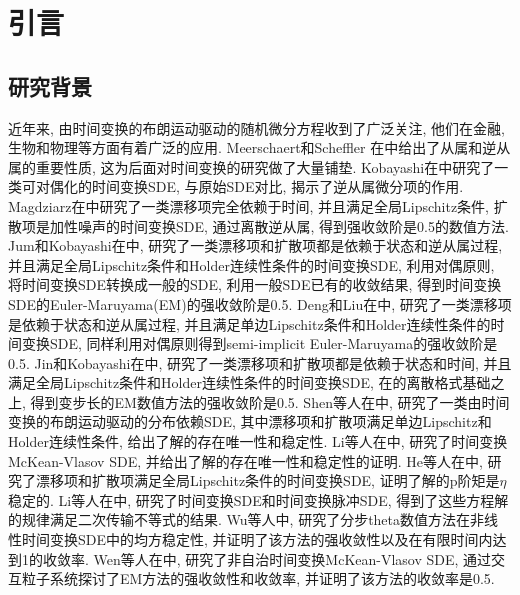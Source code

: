 

\chapter{引言}\label{chap:Intro}

\section{研究背景}\label{sec:background}

近年来, 由时间变换的布朗运动驱动的随机微分方程收到了广泛关注, 他们在金融, 生物和物理等方面有着广泛的应用. Meerschaert和Scheffler 在\cite{meerschaert2004limit}中给出了从属和逆从属的重要性质, 这为后面对时间变换的研究做了大量铺垫. Kobayashi在\cite{kobayashi2011stochastic}中研究了一类可对偶化的时间变换SDE, 与原始SDE对比, 揭示了逆从属微分项的作用. Magdziarz在\cite{magdziarz2009stochastic}中研究了一类漂移项完全依赖于时间, 并且满足全局Lipschitz条件, 扩散项是加性噪声的时间变换SDE, 通过离散逆从属, 得到强收敛阶是0.5的数值方法. Jum和Kobayashi在\cite{jum2014strong}中, 研究了一类漂移项和扩散项都是依赖于状态和逆从属过程, 并且满足全局Lipschitz条件和Holder连续性条件的时间变换SDE, 利用对偶原则, 将时间变换SDE转换成一般的SDE, 利用一般SDE已有的收敛结果, 得到时间变换SDE的Euler-Maruyama(EM)的强收敛阶是0.5. Deng和Liu在\cite{deng2020semi}中, 研究了一类漂移项是依赖于状态和逆从属过程, 并且满足单边Lipschitz条件和Holder连续性条件的时间变换SDE, 同样利用对偶原则得到semi-implicit Euler-Maruyama的强收敛阶是0.5. Jin和Kobayashi在\cite{jin2021strong}中, 研究了一类漂移项和扩散项都是依赖于状态和时间, 并且满足全局Lipschitz条件和Holder连续性条件的时间变换SDE, 在\cite{magdziarz2009stochastic}的离散格式基础之上, 得到变步长的EM数值方法的强收敛阶是0.5. Shen等人在\cite{shen2023class}中, 研究了一类由时间变换的布朗运动驱动的分布依赖SDE, 其中漂移项和扩散项满足单边Lipschitz和Holder连续性条件, 给出了解的存在唯一性和稳定性. Li等人在\cite{li2023mckean}中, 研究了时间变换McKean-Vlasov SDE, 并给出了解的存在唯一性和稳定性的证明. He等人在\cite{he2024eta}中, 研究了漂移项和扩散项满足全局Lipschitz条件的时间变换SDE, 证明了解的p阶矩是$\eta$稳定的. Li等人在\cite{li2023transportation}中, 研究了时间变换SDE和时间变换脉冲SDE, 得到了这些方程解的规律满足二次传输不等式的结果. Wu等人\cite{wu2024mean}中, 研究了分步theta数值方法在非线性时间变换SDE中的均方稳定性, 并证明了该方法的强收敛性以及在有限时间内达到1的收敛率. Wen等人在\cite{wen2023strong}中, 研究了非自治时间变换McKean-Vlasov SDE, 通过交互粒子系统探讨了EM方法的强收敛性和收敛率, 并证明了该方法的收敛率是0.5. 

